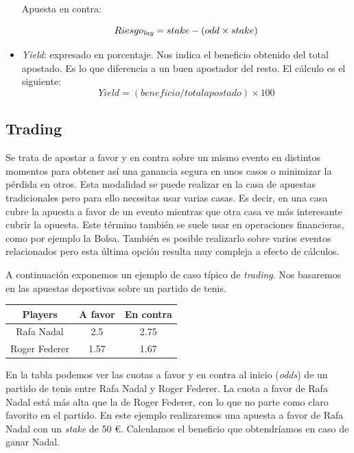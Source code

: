 \begin{itemize}
	Apuesta en contra:
	
 \begin{displaymath}
 Riesgo_\emph{lay} = stake - (odd \times stake)
\end{displaymath}

\item \emph{Yield}: expresado en porcentaje. Nos indica el beneficio obtenido del total apostado. Es lo que diferencia a un buen apostador del resto. El cálculo es el siguiente:
\begin{displaymath}
 Yield = (beneficio / total apostado) \times 100 
\end{displaymath}
\end{itemize} 


 
 \subsection{Trading}
 
 Se trata de apostar a favor y en contra sobre un mismo evento en distintos momentos para obtener así una ganancia segura en unos casos o minimizar la pérdida en otros.  Esta modalidad se puede realizar en la casa de apuestas tradicionales pero para ello necesitas usar varias casas.  Es decir, en una casa cubre la apuesta a favor de un evento mientras que otra casa ve más interesante cubrir la opuesta. Este término también se suele usar en operaciones financieras, como por ejemplo la Bolsa. También es posible realizarlo sobre varios eventos relacionados pero esta última opción resulta muy compleja a efecto de cálculos.
 
A continuación exponemos un ejemplo de caso típico de \emph{trading}. Nos basaremos en las apuestas deportivas sobre un partido de tenis.
 
 \begin{center}
    \begin{tabular}{| c | c | c |}
      \hline
      \hline
      \textbf{Players} & \textbf{A favor} & \textbf{En contra}\\
      \hline
      \hline
      Rafa Nadal & 2.5 & 2.75\\
      \hline
      \hline
      Roger Federer & 1.57 & 1.67\\
      \hline
      \hline
    \end{tabular}
  \end{center}


En la tabla podemos ver las cuotas a favor y en contra al inicio (\emph{odds}) de un partido de tenis entre Rafa Nadal y Roger Federer. La cuota a favor de Rafa Nadal está más alta que la de Roger Federer, con lo que no parte como claro favorito en el partido. En este ejemplo realizaremos una apuesta a favor de Rafa Nadal con un \emph{stake} de 50 \euro . Calculamos el beneficio que obtendríamos en caso de ganar Nadal.

